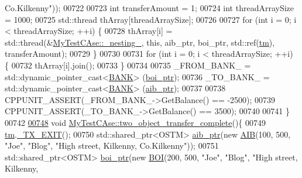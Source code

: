 \begin{DoxyCode}
{       Co.Kilkenny"}));
00722     
00723     \textcolor{keywordtype}{int} transferAmount = 1;
00724     \textcolor{keywordtype}{int} threadArraySize = 1000; 
00725     std::thread thArray[threadArraySize];
00726 
00727     \textcolor{keywordflow}{for} (\textcolor{keywordtype}{int} i = 0; i < threadArraySize; ++i) \{
00728         thArray[i] = std::thread(&\hyperlink{class_my_test_c_ase_abb973a1396c1083891d76845e2cfaf64_abb973a1396c1083891d76845e2cfaf64}{MyTestCAse::\_nesting\_}, \textcolor{keyword}{this}, aib\_ptr, boi\_ptr, 
      std::ref(\hyperlink{class_my_test_c_ase_a422e6e5d4ddedea384be96031c89b72b_a422e6e5d4ddedea384be96031c89b72b}{tm}), transferAmount);
00729     \}
00730     
00731     \textcolor{keywordflow}{for} (\textcolor{keywordtype}{int} i = 0; i < threadArraySize; ++i) \{
00732         thArray[i].join();
00733     \}
00734     
00735     \_FROM\_BANK\_ = std::dynamic\_pointer\_cast<\hyperlink{class_b_a_n_k}{BANK}> (\hyperlink{class_my_test_c_ase_a5554de9e3e6393a89c66c036c529720b_a5554de9e3e6393a89c66c036c529720b}{boi\_ptr});
00736     \_TO\_BANK\_ = std::dynamic\_pointer\_cast<\hyperlink{class_b_a_n_k}{BANK}> (\hyperlink{class_my_test_c_ase_adad50e8278b64aa0321000b528e5362c_adad50e8278b64aa0321000b528e5362c}{aib\_ptr});
00737     
00738     CPPUNIT\_ASSERT(\_FROM\_BANK\_->GetBalance() == -2500);
00739     CPPUNIT\_ASSERT(\_TO\_BANK\_->GetBalance() == 3500);
00740     
00741 \}
00742 
\hypertarget{_my_test_c_ase_8cpp_source.tex_l00748}{}\hyperlink{class_my_test_c_ase_a6399ca8bca3f10a0f114a070d3e3a570_a6399ca8bca3f10a0f114a070d3e3a570}{00748} \textcolor{keywordtype}{void} \hyperlink{class_my_test_c_ase_a6399ca8bca3f10a0f114a070d3e3a570_a6399ca8bca3f10a0f114a070d3e3a570}{MyTestCAse::two\_object\_transfer\_complete}()\{
00749     \hyperlink{class_my_test_c_ase_a422e6e5d4ddedea384be96031c89b72b_a422e6e5d4ddedea384be96031c89b72b}{tm}.\hyperlink{class_t_m_a5e2d1127f2429f2f524d25f430eade06_a5e2d1127f2429f2f524d25f430eade06}{\_TX\_EXIT}();
00750     std::shared\_ptr<OSTM> \hyperlink{class_my_test_c_ase_adad50e8278b64aa0321000b528e5362c_adad50e8278b64aa0321000b528e5362c}{aib\_ptr}(\textcolor{keyword}{new} \hyperlink{class_a_i_b}{AIB}(100, 500, \textcolor{stringliteral}{"Joe"}, \textcolor{stringliteral}{"Blog"}, \textcolor{stringliteral}{"High street, Kilkenny,
       Co.Kilkenny"}));
00751     std::shared\_ptr<OSTM> \hyperlink{class_my_test_c_ase_a5554de9e3e6393a89c66c036c529720b_a5554de9e3e6393a89c66c036c529720b}{boi\_ptr}(\textcolor{keyword}{new} \hyperlink{class_b_o_i}{BOI}(200, 500, \textcolor{stringliteral}{"Joe"}, \textcolor{stringliteral}{"Blog"}, \textcolor{stringliteral}{"High street, Kilkenny,
}
\end{DoxyCode}
